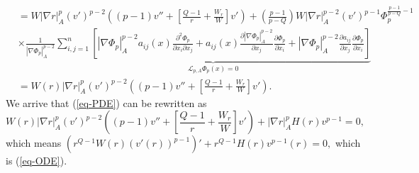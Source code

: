 \documentclass[a4paper,12pt,reqno]{amsart}
\renewcommand\eqref[1]{(\ref{#1})} %
\theoremstyle{theorem}
\numberwithin{equation}{section}
\theoremstyle{plain}
\theoremstyle{definition}
\theoremstyle{defi}
\begin{document}
\begin{align*}
&=W |\nabla r|_A^p (v')^{p-2}\left( (p-1) v'' +  \left[\frac{Q-1}{r} +  \frac{W_r}{W}\right] v'\right) +  \left(\frac{p-1}{p-Q} \right)W |\nabla r|_A^{p-2} (v')^{p-1}\Phi_p^{\frac{p-1}{p-Q}-1}\\
& \times \frac{1}{|\nabla \Phi_p|^{p-2}_A}\underbrace{\sum_{i,j=1}^n\left[|\nabla \Phi_p|^{p-2}_Aa_{ij}(x)\frac{\partial^2 \Phi_p}{\partial x_i\partial x_j} + a_{ij}(x)\frac{\partial |\nabla \Phi_p|_A^{p-2}}{\partial x_j}\frac{\partial \Phi_p}{\partial x_i} + |\nabla \Phi_p|^{p-2}_A\frac{\partial a_{ij}}{\partial x_j}\frac{\partial \Phi_p}{\partial x_i}\right]}_{\mathcal{L}_{p,A}\Phi_p(x)=0} \\
& = W (r)|\nabla r|_A^p (v')^{p-2}\left( (p-1) v'' +  \left[\frac{Q-1}{r} +  \frac{W_r}{W}\right] v'\right).
\end{align*}
We arrive that \eqref{eq-PDE} can be rewritten as
\begin{equation}
	 W (r)|\nabla r|_A^p (v')^{p-2}\left( (p-1) v'' +  \left[\frac{Q-1}{r} +  \frac{W_r}{W}\right] v'\right) + |\nabla r|_A^pH(r) v^{p-1} =0,
\end{equation}
which means $(r^{Q-1} W(r) (v'(r))^{p-1})' + r^{Q-1}H(r) v^{p-1}(r) =0,$ which is \eqref{eq-ODE}.
\end{document}
